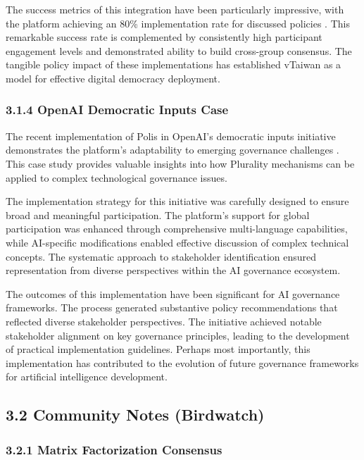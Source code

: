 The success metrics of this integration have been particularly impressive, with the platform achieving an 80\% implementation rate for discussed policies \citep{vtaiwan2023}. This remarkable success rate is complemented by consistently high participant engagement levels and demonstrated ability to build cross-group consensus. The tangible policy impact of these implementations has established vTaiwan as a model for effective digital democracy deployment.

\hypertarget{openai-democratic-inputs-case}{%
\subsubsection{3.1.4 OpenAI Democratic Inputs Case}\label{openai-democratic-inputs-case}}

The recent implementation of Polis in OpenAI's democratic inputs initiative demonstrates the platform's adaptability to emerging governance challenges \citep{polis2024}. This case study provides valuable insights into how Plurality mechanisms can be applied to complex technological governance issues.

The implementation strategy for this initiative was carefully designed to ensure broad and meaningful participation. The platform's support for global participation was enhanced through comprehensive multi-language capabilities, while AI-specific modifications enabled effective discussion of complex technical concepts. The systematic approach to stakeholder identification ensured representation from diverse perspectives within the AI governance ecosystem.

The outcomes of this implementation have been significant for AI governance frameworks. The process generated substantive policy recommendations that reflected diverse stakeholder perspectives. The initiative achieved notable stakeholder alignment on key governance principles, leading to the development of practical implementation guidelines. Perhaps most importantly, this implementation has contributed to the evolution of future governance frameworks for artificial intelligence development.

\hypertarget{community-notes-birdwatch}{%
\subsection{3.2 Community Notes (Birdwatch)}\label{community-notes-birdwatch}}

\hypertarget{matrix-factorization-consensus}{%
\subsubsection{3.2.1 Matrix Factorization Consensus}\label{matrix-factorization-consensus}}

